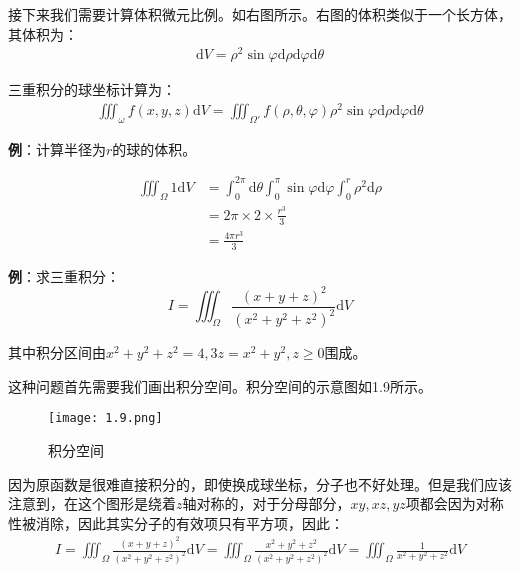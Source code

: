 \documentclass{ctexart}
\let\oldtextbf\textbf
\renewcommand{\textbf}[1]{\textcolor{brown!50!red}{\oldtextbf{#1}}}
\begin{document}
接下来我们需要计算体积微元比例。如右图所示。右图的体积类似于一个长方体，其体积为：
\begin{align*}
\mathrm{d}V=\rho^2\sin\varphi\mathrm{d}\rho\mathrm{d}\varphi\mathrm{d}\theta   
\end{align*}
\begin{tcolorbox}[
    colback=bac2,     %
    colframe=fra2,   %
    coltitle=white,             %
    coltext=tex2,
    title=三重积分的球坐标计算,
    fonttitle=\bfseries,        %
arc=3mm,                     %
breakable
]
三重积分的球坐标计算为：
\begin{align*}
    \iiint_{\omega} f(x,y,z)\mathrm{d}V=\iiint_{\Omega'}f(\rho,\theta,\varphi)\rho^2\sin\varphi \mathrm{d}\rho\mathrm{d}\varphi\mathrm{d}\theta\tag{1-14}
\end{align*}
\end{tcolorbox}

\textbf{\color{brown!50!red}例}：计算半径为$r$的球的体积。

\begin{align*}
\iiint_\Omega 1\mathrm{d}V&=\int_0^{2\pi}\mathrm{d}\theta \int_0^\pi\sin\varphi\mathrm{d}\varphi
\int_0^r\rho^2\mathrm{d}\rho\\
&=2\pi \times 2\times \frac{r^3}{3}\\
&=\frac{4\pi r^3}{3}      
\end{align*}

\textbf{\color{brown!50!red}例}：求三重积分：
\[I=\iiint_\Omega \frac{(x+y+z)^2}{(x^2+y^2+z^2)^2}\mathrm{d}V\]

其中积分区间由$x^2+y^2+z^2=4,3z=x^2+y^2,z\geq0$围成。

这种问题首先需要我们画出积分空间。积分空间的示意图如1.9所示。
\begin{figure}[H]    
\centering     
\renewcommand{\figurename}{图}     
\renewcommand{\thefigure}{1.9}    
\begin{myimagebox}[width=0.665\textwidth] %
\texttt{[image: 1.9.png]} %
\end{myimagebox}     
\caption{\label{fig:1.9}积分空间}   
\end{figure}

因为原函数是很难直接积分的，即使换成球坐标，分子也不好处理。但是我们应该注意到，在这个图形是绕着$z$轴对称的，对于分母部分，$xy,xz,yz$项都会因为对称性被消除，因此其实分子的有效项只有平方项，因此：
\begin{align*}
   I=\iiint_\Omega \frac{(x+y+z)^2}{(x^2+y^2+z^2)^2}\mathrm{d}V=
\iiint_\Omega \frac{x^2+y^2+z^2}{(x^2+y^2+z^2)^2}\mathrm{d}V
=\iiint_\Omega \frac{1}{x^2+y^2+z^2}\mathrm{d}V
\end{align*}
\end{document}
